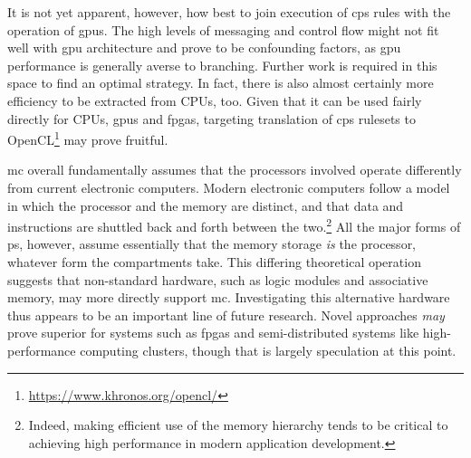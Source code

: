 It is not yet apparent, however, how best to join execution of \gls{cps} rules with the operation of \glspl{gpu}.  The high levels of messaging and control flow might not fit well with \gls{gpu} architecture and prove to be confounding factors, as \gls{gpu} performance is generally averse to branching.  Further work is required in this space to find an optimal strategy.  In fact, there is also almost certainly more efficiency to be extracted from CPUs, too.  Given that it can be used fairly directly for CPUs, \glspl{gpu} and \glspl{fpga}, targeting translation of \gls{cps} \glspl{ruleset} to OpenCL\footnote{\url{https://www.khronos.org/opencl/}} may prove fruitful.

\Gls{mc} overall fundamentally assumes that the processors involved operate differently from current electronic computers.  Modern electronic computers follow a model in which the processor and the memory are distinct, and that data and instructions are shuttled back and forth between the two.\footnote{Indeed, making efficient use of the memory hierarchy tends to be critical to achieving high performance in modern application development.}  All the major forms of \gls{ps}, however, assume essentially that the memory storage \emph{is} the processor, whatever form the \glspl{compartment} take.  This differing theoretical operation suggests that non-standard hardware, such as logic modules and associative memory, may more directly support \gls{mc}.  Investigating this alternative hardware thus appears to be an important line of future research.  Novel approaches \emph{may} prove superior for systems such as \glspl{fpga} and semi-distributed systems like high-performance computing clusters, though that is largely speculation at this point.


